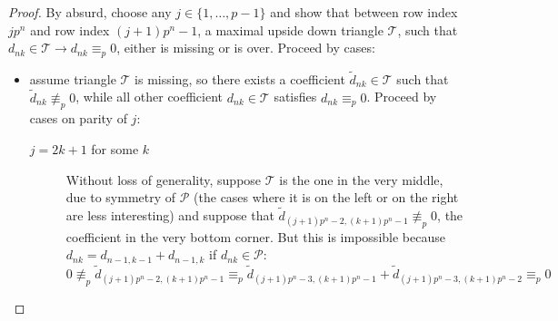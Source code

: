 \documentclass[11pt,a4paper]{article} %
\begin{document}
    \begin{proof}
        By absurd, choose any $j\in \lbrace 1, \ldots, p-1 \rbrace$ and show
        that between row index $j p^n$ and row index $(j+1)p^n -1$, 
        a maximal upside down triangle $\mathcal{T}$,
        such that $d_{nk}\in\mathcal{T} \rightarrow d_{nk} \equiv_{p} 0$,
        either is missing or is over. Proceed by cases:
        \begin{itemize}
            \item assume triangle $\mathcal{T}$ is missing, so there exists a coefficient
                    $\tilde{d}_{nk}\in\mathcal{T}$ such that $\tilde{d}_{nk}\not\equiv_{p}0$, while all 
                    other coefficient $d_{nk}\in\mathcal{T}$ satisfies $d_{nk} \equiv_{p}0$.
                    Proceed by cases on parity of $j$:
                \begin{description}
                    \item[$j=2k+1$ for some $k$] Without loss of generality, suppose $\mathcal{T}$ is the one in the 
                    very middle, due to symmetry of $\mathcal{P}$ (the cases where it is on the left or 
                    on the right are less interesting) and
                    suppose that $\tilde{d}_{(j+1) p^n -2, (k+1)p^n -1}\not\equiv_{p}0$, the coefficient in the very bottom corner.
                    But this is impossible because $d_{nk} = d_{n-1,k-1} + d_{n-1, k}$ if $d_{nk}\in \mathcal{P}$:
                    \begin{displaymath}
                    0\not\equiv_{p}\tilde{d}_{(j+1) p^n -2, (k+1)p^n -1} \equiv_{p} 
                        \tilde{d}_{(j+1) p^n -3, (k+1)p^n -1} + \tilde{d}_{(j+1) p^n -3, (k+1)p^n-2 }\equiv_{p}0
                    \end{displaymath}


\end{description}
\end{itemize}
\end{proof}
\end{document}
